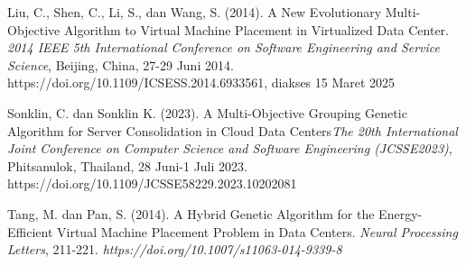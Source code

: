 \begin{thebibliography}{99}
	Liu, C., Shen, C., Li, S., dan Wang, S. (2014). A New Evolutionary Multi-Objective Algorithm to Virtual Machine Placement in Virtualized Data Center. \textit{2014 IEEE 5th International Conference on Software Engineering and Service Science}, Beijing, China, 27-29 Juni 2014. https://doi.org/10.1109/ICSESS.2014.6933561, diakses 15 Maret 2025 

	Sonklin, C. dan Sonklin K. (2023). A Multi-Objective Grouping Genetic Algorithm for Server Consolidation in Cloud Data Centers\textit{The 20th International Joint Conference on Computer Science and Software Engineering (JCSSE2023)}, Phitsanulok, Thailand, 28 Juni-1 Juli 2023. https://doi.org/10.1109/JCSSE58229.2023.10202081

	Tang, M. dan Pan, S. (2014). A Hybrid Genetic Algorithm for the Energy-Efficient Virtual Machine Placement Problem in Data Centers. \textit{Neural Processing Letters}, 211-221. \textit{https://doi.org/10.1007/s11063-014-9339-8}


\end{thebibliography}
